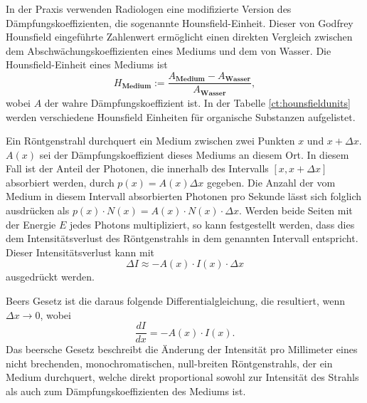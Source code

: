 In der Praxis verwenden Radiologen eine modifizierte Version des Dämpfungskoeffizienten, die sogenannte Hounsfield-Einheit. Dieser von Godfrey Hounsfield eingeführte Zahlenwert ermöglicht einen direkten Vergleich zwischen dem Abschwächungskoeffizienten eines Mediums und dem von Wasser. Die Hounsfield-Einheit eines Mediums ist
\begin{equation}
	H_{\textbf{Medium}} := \dfrac{A_{\textbf{Medium}}-A_{\textbf{Wasser}}}{A_{\textbf{Wasser}}},
\end{equation}
wobei $A$ der wahre Dämpfungskoeffizient ist. In der Tabelle \ref{ct:hounsfieldunits} werden verschiedene Hounsfield Einheiten für organische Substanzen aufgelistet.

Ein Röntgenstrahl durchquert ein Medium zwischen zwei Punkten $x$ und $x + \Delta x$. $A(x)$ sei der Dämpfungskoeffizient dieses Mediums an diesem Ort. In diesem Fall ist der Anteil der Photonen, die innerhalb des Intervalls $[x, x + \Delta x]$ absorbiert werden, durch $p(x) = A(x)\Delta x$ gegeben. Die Anzahl der vom Medium in diesem Intervall absorbierten Photonen pro Sekunde lässt sich folglich ausdrücken als $p(x) \cdot N(x) = A(x) \cdot N(x) \cdot \Delta x$. Werden beide Seiten mit der Energie $E$ jedes Photons multipliziert, so kann festgestellt werden, dass dies dem Intensitätsverlust des Röntgenstrahls in dem genannten Intervall entspricht. Dieser Intensitätsverlust kann mit 
\begin{equation}
	\Delta I \approx -A(x) \cdot I(x) \cdot \Delta x
\end{equation}
ausgedrückt werden.

Beers Gesetz ist die daraus folgende Differentialgleichung, die resultiert, wenn $\Delta x \rightarrow 0$, wobei 
\begin{equation}
	\dfrac{dI}{dx} = -A(x)\cdot I(x).
\end{equation}
Das beersche Gesetz beschreibt die Änderung der Intensität pro Millimeter eines nicht brechenden, monochromatischen, null-breiten Röntgenstrahls, der ein Medium durchquert, welche direkt proportional sowohl zur Intensität des Strahls als auch zum Dämpfungskoeffizienten des Mediums ist.


